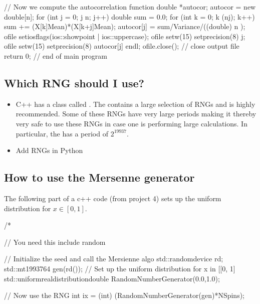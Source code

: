 \documentclass[letterpaper,10pt,english]{sphinxmanual}
\begin{document}
\begin{sphinxVerbatim}[commandchars=\\\{\}]
         // Now we compute the autocorrelation function
         double *autocor;  autocor = new double[n];
         for (int j = 0; j \PYGZlt{} n; j++)\PYGZob{}
           double sum = 0.0;
           for (int k = 0; k \PYGZlt{} (n\PYGZhy{}j); k++)\PYGZob{}
    	 sum  += (X[k]\PYGZhy{}Mean)*(X[k+j]\PYGZhy{}Mean); 
           \PYGZcb{}
           autocor[j] = sum/Variance/((double) n );
           ofile \PYGZlt{}\PYGZlt{} setiosflags(ios::showpoint | ios::uppercase);
           ofile \PYGZlt{}\PYGZlt{} setw(15) \PYGZlt{}\PYGZlt{} setprecision(8) \PYGZlt{}\PYGZlt{} j;
           ofile \PYGZlt{}\PYGZlt{} setw(15) \PYGZlt{}\PYGZlt{} setprecision(8) \PYGZlt{}\PYGZlt{} autocor[j] \PYGZlt{}\PYGZlt{} endl;
         \PYGZcb{}
         ofile.close();  // close output file
         return 0;
    \PYGZcb{}  // end of main program 
\end{sphinxVerbatim}


\subsection{Which RNG should I use?}
\label{\detokenize{chapter2:which-rng-should-i-use}}\begin{itemize}
\item {} 
C++ has a class called . The  contains a large selection of RNGs and is highly recommended. Some of these RNGs have very large periods making it thereby very safe to use these RNGs in case one is performing large calculations. In particular, the  has a period of \(2^{19937}\).

\item {} 
Add RNGs in Python

\end{itemize}


\subsection{How to use the Mersenne generator}
\label{\detokenize{chapter2:how-to-use-the-mersenne-generator}}
The following part of a c++ code (from project 4) sets up the uniform distribution for \(x\in [0,1]\).

\begin{sphinxVerbatim}[commandchars=\\\{\}]
    /*
    
    //  You need this 
    \PYGZsh{}include \PYGZlt{}random\PYGZgt{}
    
    // Initialize the seed and call the Mersienne algo
    std::random\PYGZus{}device rd;
    std::mt19937\PYGZus{}64 gen(rd());
    // Set up the uniform distribution for x \PYGZbs{}in [[0, 1]
    std::uniform\PYGZus{}real\PYGZus{}distribution\PYGZlt{}double\PYGZgt{} RandomNumberGenerator(0.0,1.0);
    
    // Now use the RNG
    int ix = (int) (RandomNumberGenerator(gen)*NSpins);
\end{sphinxVerbatim}
\end{document}
